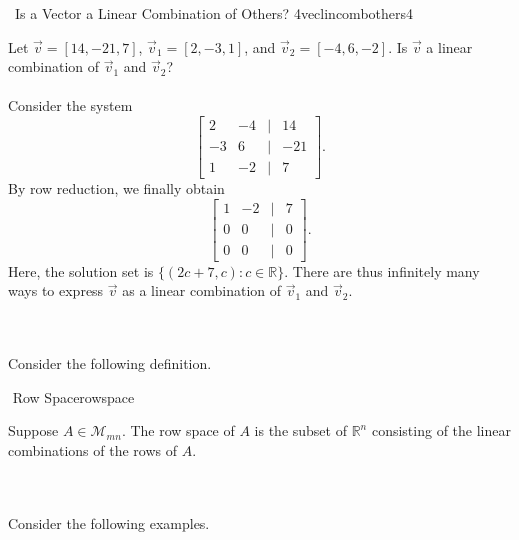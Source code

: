         \pagebreak
        \begin{example}{\Difficulty\,\Difficulty\,\,Is a Vector a Linear Combination of Others? 4}{veclincombothers4}
        
            Let \(\vec{v}=[14,-21,7]\), \(\vec{v}_1=[2,-3,1]\), and \(\vec{v}_2=[-4,6,-2]\). Is \(\vec{v}\) a linear combination of \(\vec{v}_1\) and \(\vec{v}_2\)?
            \\
            \\
            Consider the system
            \begin{equation*}
                \begin{bmatrix}
                    2 & -4 & | & 14 \\
                    -3 & 6 & | & -21 \\
                    1 & -2 & | & 7
                \end{bmatrix}.
            \end{equation*}
            By row reduction, we finally obtain
            \begin{equation*}
                \begin{bmatrix}
                    1 & -2 & | & 7 \\
                    0 & 0 & | & 0 \\
                    0 & 0 & | & 0
                \end{bmatrix}.
            \end{equation*}
            Here, the solution set is \(\{(2c+7,c):c\in\mathbb{R}\}\). There are thus infinitely many ways to express \(\vec{v}\) as a linear combination of \(\vec{v}_1\) and \(\vec{v}_2\).
            
        \end{example}
        \vphantom
        \\
        \\
        Consider the following definition.
        \begin{definition}{\Stop\,\,Row Space}{rowspace}
        
            Suppose \(A\in\mathcal{M}_{mn}\). The row space of \(A\) is the subset of \(\mathbb{R}^n\) consisting of the linear combinations of the rows of \(A\).
            
        \end{definition}
        \vphantom
        \\
        \\
        Consider the following examples.
